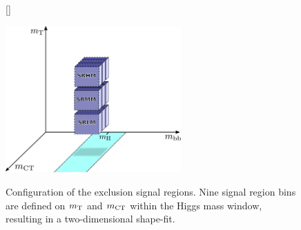 \begin{figure}
[\FBwidth]
{\caption{Configuration of the exclusion signal regions. Nine signal region bins are defined on $m_{\textrm{T}}$ and $m_{\textrm{CT}}$ within the Higgs mass window, resulting in a two-dimensional shape-fit.}\label{fig:sr_strategy}}
{\includegraphics[width=0.6\textwidth]{strategy_2}}
\end{figure}


